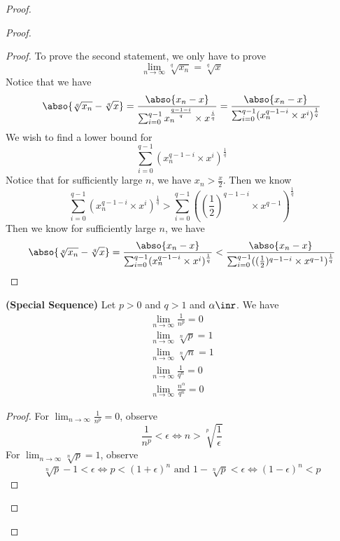\documentclass{report}
\begin{document}
\begin{proof}
\begin{proof}
\begin{proof}
To prove the second statement, we only have to prove
\begin{equation*}
\lim_{n\to\infty} \sqrt[q]{x_n} =\sqrt[q]{x} 
\end{equation*}
Notice that we have
\begin{equation*}
\abso{\sqrt[q]{x_n}-\sqrt[q]{x}}=\frac{\abso{x_n-x}}{\sum_{i=0}^{q-1}x_n^{\frac{q-1-i}{q}}\times x^{\frac{i}{q}}}=\frac{\abso{x_n-x}}{\sum_{i=0}^{q-1}(x_n^{q-1-i}\times x^i)^{\frac{1}{q}}}
\end{equation*}
We wish to find a lower bound for 
\begin{equation*}
\sum_{i=0}^{q-1}(x_n^{q-1-i}\times x^i)^{\frac{1}{q}}
\end{equation*}
Notice that for sufficiently large $n$, we have $x_n>\frac{x}{2}$. Then we know
 \begin{equation*}
\sum_{i=0}^{q-1}(x_n^{q-1-i}\times x^i)^{\frac{1}{q}}>\sum_{i=0}^{q-1}((\frac{1}{2})^{q-1-i}\times x^{q-1} )^{\frac{1}{q}}
\end{equation*}
Then we know for sufficiently large $n$, we have
 \begin{equation*}
\abso{\sqrt[q]{x_n}-\sqrt[q]{x} }=\frac{\abso{x_n-x}}{\sum_{i=0}^{q-1}(x_n^{q-1-i}\times x^i)^{\frac{1}{q}}}<\frac{\abso{x_n-x}}{\sum_{i=0}^{q-1}((\frac{1}{2})^{q-1-i}\times x^{q-1})^{\frac{1}{q}}}
\end{equation*}
\end{proof}
\begin{theorem}
\label{4.1.9}
\textbf{(Special Sequence)} Let $p>0$ and $q>1$ and $\alpha \inr$. We have
\begin{gather*}
\lim_{n\to\infty}\frac{1}{n^p}=0\\
\lim_{n\to\infty}\sqrt[n]{p}=1\\
\lim_{n\to\infty}\sqrt[n]{n}=1\\
\lim_{n\to\infty}\frac{1}{q^n}=0\\
\lim_{n\to\infty}\frac{n^{\alpha }}{q^n}=0
\end{gather*}
\end{theorem}
\begin{proof}
For $\lim_{n\to\infty}\frac{1}{n^p}=0$, observe
\begin{equation*}
\frac{1}{n^p}<\epsilon \iff n>\sqrt[p]{\frac{1}{\epsilon }}  
\end{equation*}
For $\lim_{n\to\infty}\sqrt[n]{p}=1$, observe
\begin{equation*}
\sqrt[n]{p}-1<\epsilon  \iff p<(1+\epsilon )^n\text{ and }1-\sqrt[n]{p}<\epsilon \iff (1-\epsilon )^n<p  

\end{equation*}
\end{proof}
\end{proof}
\end{proof}
\end{document}
